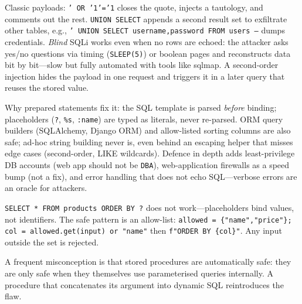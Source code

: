 Classic payloads: \texttt{' OR '1'='1} closes the quote, injects a tautology, and comments out the rest. \texttt{UNION SELECT} appends a second result set to exfiltrate other tables, e.g., \texttt{' UNION SELECT username,password FROM users --} dumps credentials. \emph{Blind} SQLi works even when no rows are echoed: the attacker asks yes/no questions via timing (\texttt{SLEEP(5)}) or boolean pages and reconstructs data bit by bit---slow but fully automated with tools like sqlmap. A second-order injection hides the payload in one request and triggers it in a later query that reuses the stored value.

Why prepared statements fix it: the SQL template is parsed \emph{before} binding; placeholders (\texttt{?}, \texttt{\%s}, \texttt{:name}) are typed as literals, never re-parsed. ORM query builders (SQLAlchemy, Django ORM) and allow-listed sorting columns are also safe; ad-hoc string building never is, even behind an escaping helper that misses edge cases (second-order, LIKE wildcards). Defence in depth adds least-privilege DB accounts (web app should not be \texttt{DBA}), web-application firewalls as a speed bump (not a fix), and error handling that does not echo SQL---verbose errors are an oracle for attackers.

\begin{example}
\texttt{SELECT * FROM products ORDER BY ?} does not work---placeholders bind values, not identifiers. The safe pattern is an allow-list:
\texttt{allowed = \{"name","price"\}; col = allowed.get(input) or "name"} then \texttt{f"ORDER BY \{col\}"}. Any input outside the set is rejected.
\end{example}

A frequent misconception is that stored procedures are automatically safe: they are only safe when they themselves use parameterised queries internally. A procedure that concatenates its argument into dynamic SQL reintroduces the flaw.

